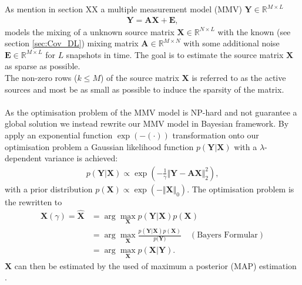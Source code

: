 As mention in section XX a multiple measurement model (MMV) $\mathbf{Y} \in \mathbb{R}^{M \times L}$
\begin{align*}
\mathbf{Y} = \mathbf{AX} + \mathbf{E},
\end{align*}
models the mixing of a unknown source matrix $\mathbf{X} \in \mathbb{R}^{N \times L}$ with the known (see section \ref{sec:Cov_DL}) mixing matrix $\mathbf{A} \in \mathbb{R}^{M \times N}$ with some additional noise $\mathbf{E} \in \mathbb{R}^{M \times L}$ for $L$ snapshots in time. The goal is to estimate the source matrix $\mathbf{X}$ as sparse as possible.
\\
The non-zero rows ($k \leq M$) of the source matrix $\mathbf{X}$ is referred to as the active sources and most be as small as possible to induce the sparsity of the matrix.
\\ \\
As the optimisation problem of the MMV model is NP-hard and not guarantee a global solution we instead rewrite our MMV model in Bayesian framework. By apply an exponential function $\exp(- (\cdot))$ transformation onto our optimisation problem a Gaussian likelihood function $p(\mathbf{Y} \vert \mathbf{X})$ with a $\lambda$-dependent variance is achieved:
\begin{align*}
p(\mathbf{Y} \vert \mathbf{X}) \propto \exp \left( - \frac{1}{\gamma} \Vert \mathbf{Y} - \mathbf{AX} \Vert_2^2 \right),
\end{align*}
with a prior distribution $p(\mathbf{X}) \propto \exp(- \Vert \mathbf{X} \Vert_0)$. The optimisation problem is the rewritten to
\begin{align*}
\mathbf{X} (\gamma) = \hat{\mathbf{X}} &= \arg \max_{\mathbf{X}} p(\mathbf{Y} \vert \mathbf{X}) p(\mathbf{X}) \\
&= \arg \max_{\mathbf{X}} \frac{p(\mathbf{Y} \vert \mathbf{X}) p(\mathbf{X})}{p(\mathbf{Y)}} \quad (\text{Bayers Formular}) \\
&= \arg \max_{\mathbf{X}} p(\mathbf{X} \vert \mathbf{Y}).
\end{align*}
$\mathbf{X}$ can then be estimated by the used of maximum a posterior (MAP) estimation \cite[p. 137]{??}.

